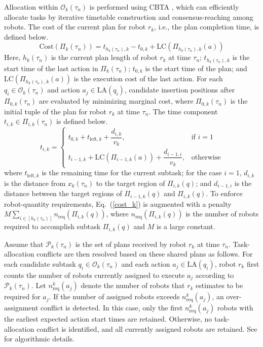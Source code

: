 \documentclass[lettersize,journal]{IEEEtran}
\begin{document}
Allocation within $\mathcal{O}_k(\tau_n)$ is performed using CBTA \cite{wang2022consensus}, which can efficiently allocate tasks by iterative timetable construction and consensus-reaching among robots.
The cost of the current plan for robot $r_k$, i.e., the plan completion time, is defined below.
\begin{equation}\label{cost_k}
\mathrm{Cost}(\Pi_k(\tau_n)) = t_{h_k(\tau_n),k} - t_{0,k} + \mathrm{LC}(\Pi_{h_k(\tau_n),k}(a))
\end{equation}
Here, $h_k(\tau_n)$ is the current plan length of robot $r_k$ at time $\tau_n$; $t_{h_k(\tau_n),k}$ is the start time of the last action in $\Pi_k(\tau_n)$; $t_{0,k}$ is the start time of the plan; and $\mathrm{LC}(\Pi_{h_k(\tau_n),k}(a))$ is the execution cost of the last action.
   For each $q_i \in \mathcal{O}_k(\tau_n)$ and action $a_j \in \mathrm{LA}(q_i)$, candidate insertion positions after $\Pi_{0,k}(\tau_n)$ are evaluated by minimizing marginal cost, where $\Pi_{0,k}(\tau_n)$ is the initial tuple of the plan for robot $r_k$ at time $\tau_n$.
    The time component $t_{i,k} \in \Pi_{i,k}(\tau_n)$ is defined below.
\begin{equation}\label{start}
    t_{i,k} =
\begin{cases}
t_{0,k} + t_{\mathrm{left},k}+\dfrac{d_{i,k}}{v_k} , & \text{if } i = 1 \\
t_{i-1, k} + \mathrm{LC}(\Pi_{i-1,k}(a))+ \dfrac{d_{i-1,i}}{v_k} , & \text{otherwise}
\end{cases}
\end{equation}
where $t_{\mathrm{left},k}$ is the remaining time for the current subtask; for the case $i=1$, $d_{i,k}$ is the distance from $x_k(\tau_n)$ to the target region of $\Pi_{i,k}(q)$; and $d_{i-1,i}$ is the distance between the target regions of $\Pi_{i-1,k}(q)$ and $\Pi_{i,k}(q)$.
To enforce robot-quantity requirements, Eq.~(\ref{cost_k}) is augmented with a penalty $M \sum_{i \in [h_k(\tau_n)]}n_\mathrm{req}(\Pi_{i,k}(q))$, where $n_\mathrm{req}(\Pi_{i,k}(q))$ is the number of robots required to accomplish subtask $\Pi_{i,k}(q)$ and $M$ is a large constant.

Assume that $\mathcal{P}_k(\tau_n)$ is the set of plans received by robot $r_k$ at time $\tau_n$. Task-allocation conflicts are then resolved based on these shared plans as follows. For each candidate subtask $q_i \in \mathcal{O}_k(\tau_n)$ and each action $a_j \in \mathrm{LA}(q_i)$, robot $r_k$ first counts the number of robots currently assigned to execute $a_j$ according to $\mathcal{P}_k(\tau_n)$. Let $n_{\mathrm{req}}^k(a_j)$ denote the number of robots that $r_k$ estimates to be required for $a_j$. If the number of assigned robots exceeds $n_{\mathrm{req}}^k(a_j)$, an over-assignment conflict is detected. In this case, only the first $n_{\mathrm{req}}^k(a_j)$ robots with the earliest expected action start times are retained. Otherwise, no task-allocation conflict is identified, and all currently assigned robots are retained. See \cite{wang2022consensus} for algorithmic details. 
\end{document}
